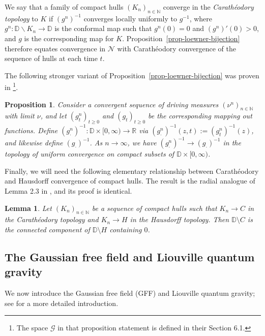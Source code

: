 \documentclass[a4paper]{article}
\numberwithin{equation}{section}
\newcommand{\D}{\mathbb{D}}
\newcommand{\R}{\mathbb{R}}
\newcommand{\N}{\mathbb{N}}
\newcommand{\cN}{\mathcal{N}}
\newtheorem{lemma}[theorem]{Lemma}
\newtheorem{proposition}[theorem]{Proposition}
\theoremstyle{remark}
\numberwithin{equation}{section}
\begin{document}
We say that a family of compact hulls $(K_n)_{n \in \N}$ converge in the \textit{Carath\'eodory topology} to $K$ if $(g^n)^{-1}$ converges locally uniformly to $g^{-1}$, where $g^n: \D \backslash K_n \to \D$ is the conformal map such that $g^n(0) = 0$ and $(g^n)'(0)>0$, and $g$ is the corresponding map for $K$.
Proposition~\ref{prop-loewner-bijection} therefore equates convergence in $\cN$ with Carath\'eodory convergence of the sequence of hulls at each time $t$.

 The following stronger variant of Proposition~\ref{prop-loewner-bijection} was proven in \cite[Proposition 6.1]{ms-qle}\footnote{The space $\mathcal G$ in that proposition statement is defined in their Section 6.1.}.
 
\begin{proposition}\label{prop-conv-loc-spacetime}
Consider a convergent sequence of driving measures $(\nu^n)_{n \in \N}$ with limit $\nu$, and let $(g^n_t)_{t \geq 0}$ and $(g_t)_{t \geq 0}$ be the corresponding mapping out functions. Define $(g^n_\cdot)^{-1}: \D \times [0,\infty) \to \R$ via $(g^n_\cdot)^{-1}(z, t) := (g^n_t)^{-1}(z)$, and likewise define  $(g_\cdot)^{-1}$. As $n \to \infty$, we have $(g^n_\cdot)^{-1}\to (g_\cdot)^{-1}$ in the topology of uniform convergence on compact subsets of $\D \times [0,\infty)$. 
\end{proposition}


Finally, we will need the following elementary relationship between Carath\'eodory and Hausdorff convergence of compact hulls. The result is the radial analogue of Lemma 2.3 in \cite{peltola2023large}, and its proof is identical.

\begin{lemma}\label{lem-hausdorff-cara-conv}
Let $(K_n)_{n \in \N}$ be a sequence of compact hulls such that $K_n \to C$ in the Carath\'eodory topology and $K_n \to H$ in the Hausdorff topology. Then $\D \setminus C$ is the connected component of $\D \setminus H$ containing $0$.
\end{lemma}


\subsection{The Gaussian free field and Liouville quantum gravity}\label{subsec-lqg-gff}
We now introduce the Gaussian free field (GFF) and Liouville quantum gravity; see \cite{berestycki-lqg-notes} for a more detailed introduction. 
\end{document}
